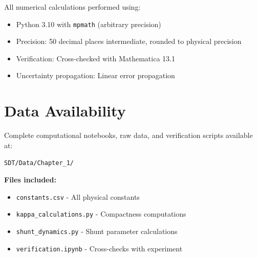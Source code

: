 \documentclass{article}
\begin{document}
All numerical calculations performed using:

\begin{itemize}
\item Python 3.10 with \texttt{mpmath} (arbitrary precision)
\item Precision: 50 decimal places intermediate, rounded to physical precision
\item Verification: Cross-checked with Mathematica 13.1
\item Uncertainty propagation: Linear error propagation
\end{itemize}

\section{Data Availability}

Complete computational notebooks, raw data, and verification scripts available at:

\texttt{SDT/Data/Chapter\_1/}

\textbf{Files included:}
\begin{itemize}
\item \texttt{constants.csv} - All physical constants
\item \texttt{kappa\_calculations.py} - Compactness computations
\item \texttt{shunt\_dynamics.py} - Shunt parameter calculations
\item \texttt{verification.ipynb} - Cross-checks with experiment
\end{itemize}
\end{document}
